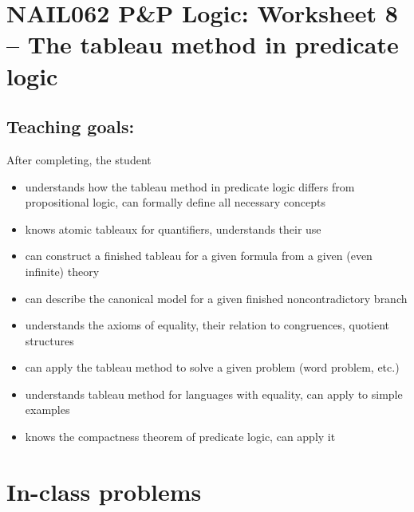\section*{NAIL062 P\&P Logic: Worksheet 8 -- The tableau method in predicate logic}


\subsection*{Teaching goals:} After completing, the student

  \begin{itemize}\setlength{\itemsep}{0pt}
        \item understands how the tableau method in predicate logic differs from propositional logic, can formally define all necessary concepts
        \item knows atomic tableaux for quantifiers, understands their use
        \item can construct a finished tableau for a given formula from a given (even infinite) theory
        \item can describe the canonical model for a given finished noncontradictory branch
        \item understands the axioms of equality, their relation to congruences, quotient structures
        \item can apply the tableau method to solve a given problem (word problem, etc.)
        \item understands tableau method for languages with equality, can apply to simple examples
        \item knows the compactness theorem of predicate logic, can apply it
    \end{itemize}

    

\section*{In-class problems}
        
